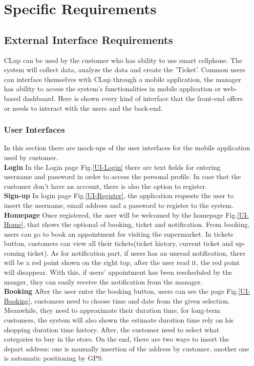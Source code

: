 \documentclass[a4paper,12pt]{report}
\begin{document}
\chapter{Specific Requirements} \label{C3:SpecificRequirements}

\section{External Interface Requirements}
CLup can be used by the customer who has ability to use smart cellphone. The system will
collect data, analyze the data and create the 'Ticket'. Common users can interface themselves with CLup through a mobile application, the manager has ability to access the system’s functionalities in mobile application or web-based dashboard. Here is shown every kind of
interface that the front-end offers or needs to interact with the users and the back-end.
\subsection{User Interfaces}
In this section there are mock-ups of the user interfaces for the mobile application used
by customer.\\

\textbf{Login} In the Login page Fig.\ref{UI-Login} there are text fields for entering username and password in order to access the personal profile. In case that the customer don't have an account, there is also the option to register.\\

\textbf{Sign-up} In login page Fig.\ref{UI-Register}, the application requests the user to insert the username, email address and a password to register to the system.\\

\textbf{Homepage} Once registered, the user will be welcomed by the homepage Fig.\ref{UI-Home}, that shows the optional of booking, ticket and notification. From booking, users can go to book an appointment for visiting the supermarket. In tickets button, customers can view all their tickets(ticket history, current ticket and up-coming ticket). As for notification part, if users has an unread notification, there will be a red point shown on the right top, after the user read it, the red point will disappear. With this, if users' appointment has been rescheduled by the manger, they can easily receive the notification from the manager.\\

\textbf{Booking} After the user enter the booking button, users can see the page Fig.\ref{UI-Booking}, customers need to choose time and date from the given selection. Meanwhile, they need to approximate their duration time, for long-term customers, the system will also shown the estimate duration time rely on his shopping duration time history. After, the customer need to select what categories to buy in the store. On the end, there are two ways to insert the depart address: one is manually insertion of the address by customer, another one is automatic positioning by GPS.\\
\end{document}
